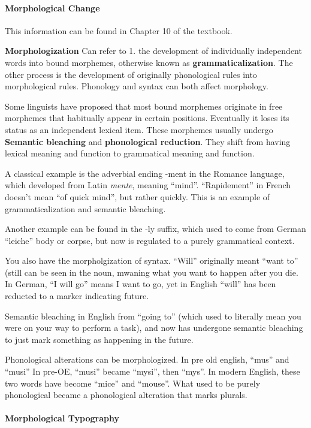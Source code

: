 \documentclass{exam}
\begin{document}
\paragraph{Morphological Change} 
This information can be found in Chapter 10 of the textbook. 

\textbf{Morphologization} Can refer to 1. the development of individually independent words into bound morphemes, otherwise known as \textbf{grammaticalization}. The other process is the development of originally phonological rules into morphological rules. 
Phonology and syntax can both affect morphology. 

Some linguists have proposed that most bound morphemes originate in free morphemes that habitually appear in certain positions. 
Eventually it loses its status as an independent lexical item. 
These morphemes usually undergo \textbf{Semantic bleaching} and \textbf{phonological reduction}. 
They shift from having lexical meaning and function to grammatical meaning and function. 

A classical example is the adverbial ending -ment in the Romance language, which developed from Latin \textit{mente}, meaning ``mind''. ``Rapidement'' in French doesn't mean ``of quick mind'', but rather quickly. This is an example of grammaticalization and semantic bleaching. 

\noindent Another example can be found in the -ly suffix, which used to come from German ``leiche'' body or corpse, but now is regulated to a purely grammatical context. 

You also have the morpholgization of syntax. ``Will'' originally meant ``want to'' (still can be seen in the noun, mwaning what you want to happen after you die. 
In German, ``I will go'' means I want to go, yet in English ``will'' has been reducted to a marker indicating future. 

Semantic bleaching in English from ``going to'' (which used to literally mean you were on your way to perform a task), and now has undergone semantic bleaching to just mark something as happening in the future. 

Phonological alterations can be morphologized. In pre old english, ``mus'' and ``musi'' 
In pre-OE, ``musi'' became ``mysi'', then ``mys''. 
In modern English, these two words have become ``mice'' and ``mouse''.
What used to be purely phonological became a phonological alteration that marks plurals.


\paragraph{Morphological Typography}
\end{document}
